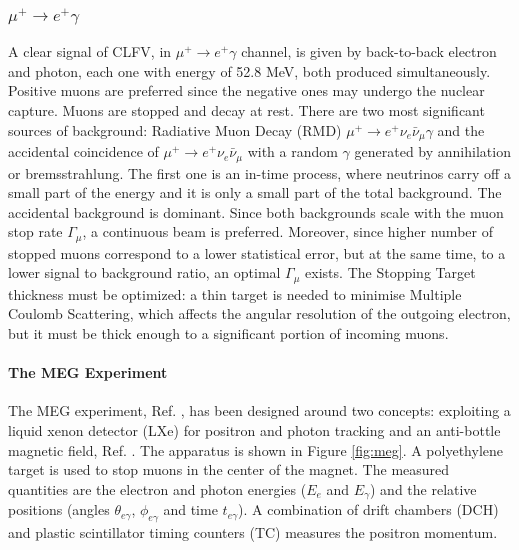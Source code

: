 \subsubsection{$\mu^+ \rightarrow e^+ \gamma$}
A clear signal of CLFV, in $\mu^+ \rightarrow e^+ \gamma$ channel, is given by back-to-back electron and photon, each one with energy of 52.8 MeV, 
both produced simultaneously. Positive muons are preferred since the negative ones may undergo the nuclear capture. 
Muons are stopped and decay at rest. There are two most significant sources of background: Radiative Muon Decay (RMD) $\mu^+ \rightarrow e^+ \nu_e \bar{\nu}_\mu \gamma$ 
and the accidental coincidence of $\mu^+ \rightarrow e^+ \nu_e \bar{\nu}_\mu$ with a random $\gamma$ 
generated by annihilation or bremsstrahlung. The first one is an in-time process, where neutrinos carry off a small part of the energy 
and it is only a small part of the total background. The accidental background is dominant. Since both backgrounds scale with the muon stop rate $\Gamma_\mu$, a continuous beam is preferred. 
Moreover, since  higher number of stopped muons correspond to a lower statistical error, but at the same time, to a lower signal to background ratio, an optimal $\Gamma_\mu$ exists.
The Stopping Target thickness must be optimized: a thin target is needed to minimise  Multiple Coulomb Scattering, which affects the angular resolution of the outgoing electron, but 
it must be thick enough to  a significant portion of incoming muons. 
\paragraph{The MEG Experiment}
The MEG experiment, Ref. \cite{megi}, has been designed around two concepts: exploiting a liquid
xenon detector (LXe) for positron and photon tracking and an anti-bottle magnetic field, Ref. \cite{clfv_signorelli}. 
The apparatus is shown in Figure \ref{fig:meg}. A polyethylene target is used to stop muons in the center of the magnet. 
The measured quantities are the electron and photon energies ($E_e$ and $E_\gamma$) and the
relative positions (angles $\theta_{e\gamma}$, $\phi_{e\gamma}$ and time $t_{e \gamma}$).
A combination of drift chambers (DCH) and plastic scintillator timing counters (TC) measures the positron momentum.



